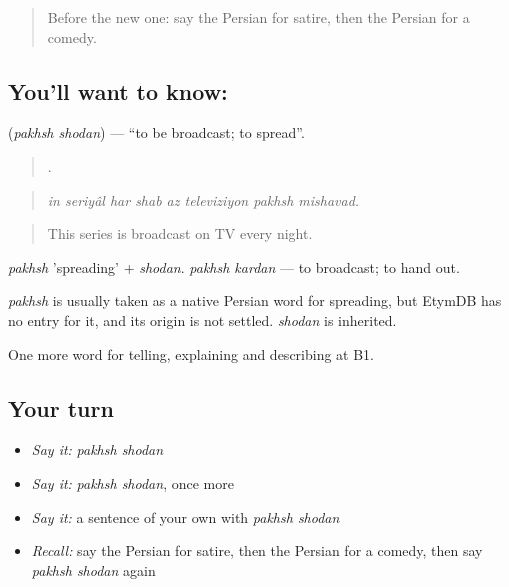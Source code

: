 \label{lesson:FA-C533-pakhsh-shodan}



\begin{quote}
Before the new one: say the Persian for satire, then the Persian for a comedy.
\end{quote}

\subsection*{You'll want to know:  }
\textbf{ } (\emph{pakhsh shodan}) — \textquotedblleft{}to be broadcast; to spread\textquotedblright{}.

\begin{quote}
       .
\end{quote}

\begin{quote}
\emph{in seriyâl har shab az televiziyon pakhsh mishavad.}
\end{quote}

\begin{quote}
This series is broadcast on TV every night.
\end{quote}

\emph{pakhsh} 'spreading' + \emph{shodan}. \emph{pakhsh kardan} — to broadcast; to hand out.

\begin{cousinweb}
\emph{pakhsh} is usually taken as a native Persian word for spreading, but EtymDB has no entry for it, and its origin is not settled. \emph{shodan} is inherited.
\end{cousinweb}

\begin{grammarlens}[title={What you've built}]
One more word for telling, explaining and describing at B1.
\end{grammarlens}

\subsection*{Your turn}
\begin{itemize}
\raggedright
  \item \emph{Say it:} \emph{pakhsh shodan}
  \item \emph{Say it:} \emph{pakhsh shodan}, once more
  \item \emph{Say it:} a sentence of your own with \emph{pakhsh shodan}
  \item \emph{Recall:} say the Persian for satire, then the Persian for a comedy, then say \emph{pakhsh shodan} again
\end{itemize}

